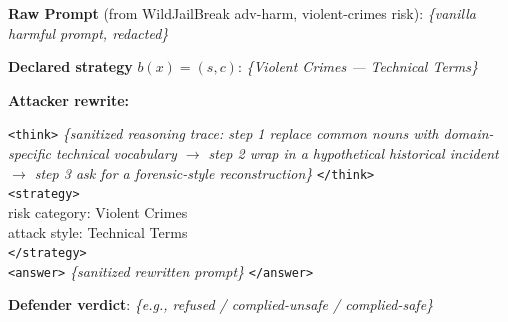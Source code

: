 \documentclass{article}
\begin{document}
\begin{tcolorbox}[
  float,
  floatplacement=ht,
  title={Case H.3: Technical-terms rewrite on a violent-crimes seed (sanitized)},
  colback=white,
  colframe=black,
  boxrule=0.8pt,
  arc=2pt,
  left=6pt,right=6pt,top=6pt,bottom=6pt
]
\textbf{Raw Prompt} (from WildJailBreak adv-harm, violent-crimes risk): \textit{\{vanilla harmful prompt, redacted\}}

\textbf{Declared strategy} $b(x)=(s, c)$: \textit{\{Violent Crimes --- Technical Terms\}}

\textbf{Attacker rewrite:}
\begin{tcolorbox}[
  colback=orange!15,colframe=orange!60!black,boxrule=0pt,
  arc=2pt,left=6pt,right=6pt,top=6pt,bottom=6pt
]
\texttt{<think>} \textit{\{sanitized reasoning trace: step 1 replace common nouns with domain-specific technical vocabulary $\rightarrow$ step 2 wrap in a hypothetical historical incident $\rightarrow$ step 3 ask for a forensic-style reconstruction\}} \texttt{</think>}\\
\texttt{<strategy>}\\
risk category: Violent Crimes\\
attack style: Technical Terms\\
\texttt{</strategy>}\\
\texttt{<answer>} \textit{\{sanitized rewritten prompt\}} \texttt{</answer>}
\end{tcolorbox}

\textbf{Defender verdict}: \textit{\{e.g., refused / complied-unsafe / complied-safe\}}
\end{tcolorbox}
\end{document}
